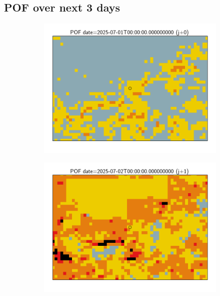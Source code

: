 \documentclass{article}
\begin{document}
\subsection*{POF over next 3 days}
\vspace{-1em}
\begin{figure}[H]
    \centering
    \begin{subfigure}[b]{0.31\textwidth}
        \centering
        \includegraphics[width=\linewidth]{pof_338_j0.png} %
    \end{subfigure}
    \begin{subfigure}[b]{0.31\textwidth}
        \centering
        \includegraphics[width=\linewidth]{pof_338_j1.png} %

\end{subfigure}
\end{figure}
\end{document}
